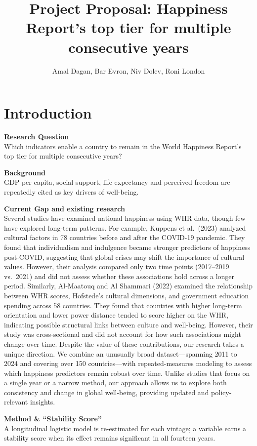\documentclass[
]{article}
\title{Project Proposal: Happiness Report's top tier for multiple
consecutive years}
\author{Amal Dagan, Bar Evron, Niv Dolev, Roni London}
\date{}
\begin{document}
\maketitle

\newpage

\section{Introduction}\label{introduction}

\textbf{Research Question}\\
Which indicators enable a country to remain in the World Happiness
Report's top tier for multiple consecutive years?

\textbf{Background}\\
GDP per capita, social support, life expectancy and perceived freedom
are repeatedly cited as key drivers of well-being.

\textbf{Current Gap and existing research}\\
Several studies have examined national happiness using WHR data, though
few have explored long-term patterns. For example, Kuppens et al.~(2023)
analyzed cultural factors in 78 countries before and after the COVID-19
pandemic. They found that individualism and indulgence became stronger
predictors of happiness post-COVID, suggesting that global crises may
shift the importance of cultural values. However, their analysis
compared only two time points (2017--2019 vs.~2021) and did not assess
whether these associations hold across a longer period. Similarly,
Al‐Maatouq and Al Shammari (2022) examined the relationship between WHR
scores, Hofstede's cultural dimensions, and government education
spending across 58 countries. They found that countries with higher
long-term orientation and lower power distance tended to score higher on
the WHR, indicating possible structural links between culture and
well-being. However, their study was cross-sectional and did not account
for how such associations might change over time. Despite the value of
these contributions, our research takes a unique direction. We combine
an unusually broad dataset---spanning 2011 to 2024 and covering over 150
countries---with repeated-measures modeling to assess which happiness
predictors remain robust over time. Unlike studies that focus on a
single year or a narrow method, our approach allows us to explore both
consistency and change in global well-being, providing updated and
policy-relevant insights.

\textbf{Method \& ``Stability Score''}\\
A longitudinal logistic model is re-estimated for each vintage; a
variable earns a stability score when its effect remains significant in
all fourteen years.
\end{document}
